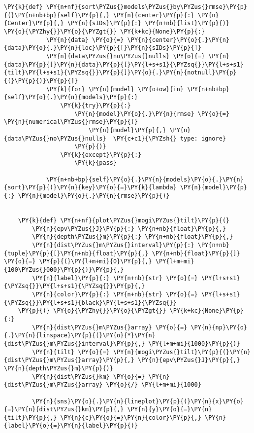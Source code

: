 \begin{tcolorbox}[breakable, size=fbox, boxrule=1pt, pad at break*=1mm,colback=cellbackground, colframe=cellborder]
\begin{Verbatim}[commandchars=\\\{\}]
        \PY{k}{def} \PY{n+nf}{sort\PYZus{}models\PYZus{}by\PYZus{}rmse}\PY{p}{(}\PY{n+nb+bp}{self}\PY{p}{,} \PY{n}{center}\PY{p}{:} \PY{n}{Center}\PY{p}{,} \PY{n}{sIDs}\PY{p}{:} \PY{n+nb}{list}\PY{p}{)} \PY{o}{\PYZhy{}}\PY{o}{\PYZgt{}} \PY{k+kc}{None}\PY{p}{:}
            \PY{n}{data} \PY{o}{=} \PY{n}{center}\PY{o}{.}\PY{n}{data}\PY{o}{.}\PY{n}{loc}\PY{p}{[}\PY{n}{sIDs}\PY{p}{]}
            \PY{n}{data\PYZus{}no\PYZus{}nulls} \PY{o}{=} \PY{n}{data}\PY{p}{[}\PY{n}{data}\PY{p}{[}\PY{l+s+s1}{\PYZsq{}}\PY{l+s+s1}{tilt}\PY{l+s+s1}{\PYZsq{}}\PY{p}{]}\PY{o}{.}\PY{n}{notnull}\PY{p}{(}\PY{p}{)}\PY{p}{]}
            \PY{k}{for} \PY{n}{model} \PY{o+ow}{in} \PY{n+nb+bp}{self}\PY{o}{.}\PY{n}{models}\PY{p}{:}
                \PY{k}{try}\PY{p}{:}
                    \PY{n}{model}\PY{o}{.}\PY{n}{rmse} \PY{o}{=} \PY{n}{numerical\PYZus{}rmse}\PY{p}{(}
                        \PY{n}{model}\PY{p}{,} \PY{n}{data\PYZus{}no\PYZus{}nulls}  \PY{c+c1}{\PYZsh{} type: ignore}
                    \PY{p}{)}
                \PY{k}{except}\PY{p}{:}
                    \PY{k}{pass}
    
            \PY{n+nb+bp}{self}\PY{o}{.}\PY{n}{models}\PY{o}{.}\PY{n}{sort}\PY{p}{(}\PY{n}{key}\PY{o}{=}\PY{k}{lambda} \PY{n}{model}\PY{p}{:} \PY{n}{model}\PY{o}{.}\PY{n}{rmse}\PY{p}{)}
    
    
    \PY{k}{def} \PY{n+nf}{plot\PYZus{}mogi\PYZus{}tilt}\PY{p}{(}
        \PY{n}{epv\PYZus{}J}\PY{p}{:} \PY{n+nb}{float}\PY{p}{,}
        \PY{n}{depth\PYZus{}m}\PY{p}{:} \PY{n+nb}{float}\PY{p}{,}
        \PY{n}{dist\PYZus{}m\PYZus{}interval}\PY{p}{:} \PY{n+nb}{tuple}\PY{p}{[}\PY{n+nb}{float}\PY{p}{,} \PY{n+nb}{float}\PY{p}{]} \PY{o}{=} \PY{p}{(}\PY{l+m+mi}{0}\PY{p}{,} \PY{l+m+mi}{100\PYZus{}000}\PY{p}{)}\PY{p}{,}
        \PY{n}{label}\PY{p}{:} \PY{n+nb}{str} \PY{o}{=} \PY{l+s+s1}{\PYZsq{}}\PY{l+s+s1}{\PYZsq{}}\PY{p}{,}
        \PY{n}{color}\PY{p}{:} \PY{n+nb}{str} \PY{o}{=} \PY{l+s+s1}{\PYZsq{}}\PY{l+s+s1}{black}\PY{l+s+s1}{\PYZsq{}}
    \PY{p}{)} \PY{o}{\PYZhy{}}\PY{o}{\PYZgt{}} \PY{k+kc}{None}\PY{p}{:}
        \PY{n}{dist\PYZus{}m\PYZus{}array} \PY{o}{=} \PY{n}{np}\PY{o}{.}\PY{n}{linspace}\PY{p}{(}\PY{o}{*}\PY{n}{dist\PYZus{}m\PYZus{}interval}\PY{p}{,} \PY{l+m+mi}{1000}\PY{p}{)}
        \PY{n}{tilt} \PY{o}{=} \PY{n}{mogi\PYZus{}tilt}\PY{p}{(}\PY{n}{dist\PYZus{}m\PYZus{}array}\PY{p}{,} \PY{n}{epv\PYZus{}J}\PY{p}{,} \PY{n}{depth\PYZus{}m}\PY{p}{)}
        \PY{n}{dist\PYZus{}km} \PY{o}{=} \PY{n}{dist\PYZus{}m\PYZus{}array} \PY{o}{/} \PY{l+m+mi}{1000}
    
        \PY{n}{sns}\PY{o}{.}\PY{n}{lineplot}\PY{p}{(}\PY{n}{x}\PY{o}{=}\PY{n}{dist\PYZus{}km}\PY{p}{,} \PY{n}{y}\PY{o}{=}\PY{n}{tilt}\PY{p}{,} \PY{n}{c}\PY{o}{=}\PY{n}{color}\PY{p}{,} \PY{n}{label}\PY{o}{=}\PY{n}{label}\PY{p}{)}
    \end{Verbatim}
    \end{tcolorbox}